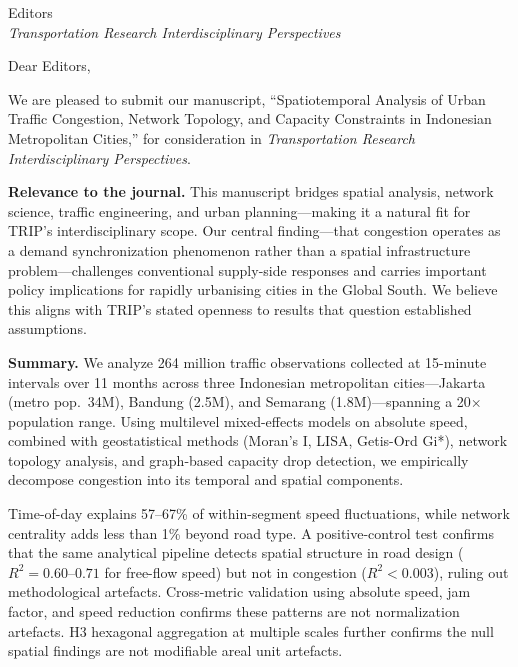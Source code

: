 \documentclass[12pt]{letter}
\date{March 20, 2026}
\begin{document}
\begin{letter}{%
Editors\\
\emph{Transportation Research Interdisciplinary Perspectives}}

\opening{Dear Editors,}

We are pleased to submit our manuscript, ``Spatiotemporal Analysis of Urban Traffic Congestion,
Network Topology, and Capacity Constraints in Indonesian Metropolitan Cities,'' for
consideration in \emph{Transportation Research Interdisciplinary Perspectives}.

\textbf{Relevance to the journal.}
This manuscript bridges spatial analysis, network science, traffic engineering, and urban
planning---making it a natural fit for TRIP's interdisciplinary scope. Our central finding---that
congestion operates as a demand synchronization phenomenon rather than a spatial infrastructure
problem---challenges conventional supply-side responses and carries important policy implications
for rapidly urbanising cities in the Global South. We believe this aligns with TRIP's stated
openness to results that question established assumptions.

\textbf{Summary.}
We analyze 264 million traffic observations collected at 15-minute intervals over 11 months
across three Indonesian metropolitan cities---Jakarta (metro pop.\ 34M), Bandung (2.5M), and
Semarang (1.8M)---spanning a 20$\times$ population range. Using multilevel mixed-effects models
on absolute speed, combined with geostatistical methods (Moran's I, LISA, Getis-Ord Gi*),
network topology analysis, and graph-based capacity drop detection, we empirically decompose
congestion into its temporal and spatial components.

Time-of-day explains 57--67\% of within-segment speed fluctuations, while network centrality
adds less than 1\% beyond road type. A positive-control test confirms that the same analytical
pipeline detects spatial structure in road design ($R^2 = 0.60$--$0.71$ for free-flow speed)
but not in congestion ($R^2 < 0.003$), ruling out methodological artefacts. Cross-metric
validation using absolute speed, jam factor, and speed reduction confirms these patterns are
not normalization artefacts. H3 hexagonal aggregation at multiple scales further confirms
the null spatial findings are not modifiable areal unit artefacts.


\end{letter}
\end{document}

